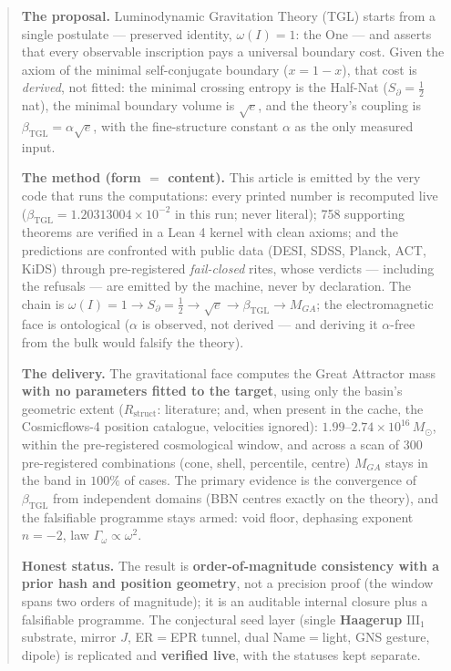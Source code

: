 \documentclass[11pt]{article}
\newcommand{\bTGL}{\beta_{\mathrm{TGL}}}\newcommand{\Msun}{M_{\odot}}\newcommand{\TGL}{\mathrm{TGL}}
\theoremstyle{definition}\newtheorem{deriv}{Derivation}
\begin{document}
\begin{abstract}

\textbf{The proposal.} Luminodynamic Gravitation Theory (TGL) starts from a single postulate --- preserved identity, $\omega(I)=1$: the One --- and asserts that every observable inscription pays a universal boundary cost. Given the axiom of the minimal self-conjugate boundary ($x=1-x$), that cost is \emph{derived}, not fitted: the minimal crossing entropy is the Half-Nat ($S_\partial=\tfrac12$ nat), the minimal boundary volume is $\sqrt e$, and the theory's coupling is $\bTGL=\alpha\sqrt e$, with the fine-structure constant $\alpha$ as the only measured input.

\textbf{The method (form $=$ content).} This article is emitted by the very code that runs the computations: every printed number is recomputed live ($\bTGL=1.20313004\times10^{-2}$ in this run; never literal); 758 supporting theorems are verified in a Lean 4 kernel with clean axioms; and the predictions are confronted with public data (DESI, SDSS, Planck, ACT, KiDS) through pre-registered \emph{fail-closed} rites, whose verdicts --- including the refusals --- are emitted by the machine, never by declaration. The chain is $\omega(I)=1\to S_\partial=\tfrac12\to\sqrt e\to\bTGL\to M_{GA}$; the electromagnetic face is ontological ($\alpha$ is observed, not derived --- and deriving it $\alpha$-free from the bulk would falsify the theory).

\textbf{The delivery.} The gravitational face computes the Great Attractor mass \textbf{with no parameters fitted to the target}, using only the basin's geometric extent ($R_{\mathrm{struct}}$: literature; and, when present in the cache, the Cosmicflows-4 position catalogue, velocities ignored): $1.99$--$2.74\times10^{16}\,\Msun$, within the pre-registered cosmological window, and across a scan of $300$ pre-registered combinations (cone, shell, percentile, centre) $M_{GA}$ stays in the band in $100\%$ of cases. The primary evidence is the convergence of $\bTGL$ from independent domains (BBN centres exactly on the theory), and the falsifiable programme stays armed: void floor, dephasing exponent $n=-2$, law $\Gamma_\omega\propto\omega^2$.

\textbf{Honest status.} The result is \textbf{order-of-magnitude consistency with a prior hash and position geometry}, not a precision proof (the window spans two orders of magnitude); it is an auditable internal closure plus a falsifiable programme. The conjectural seed layer (single \textbf{Haagerup} $\mathrm{III}_1$ substrate, mirror $J$, ER$=$EPR tunnel, dual Name$=$light, GNS gesture, dipole) is replicated and \textbf{verified live}, with the statuses kept separate.

\end{abstract}
\end{document}
